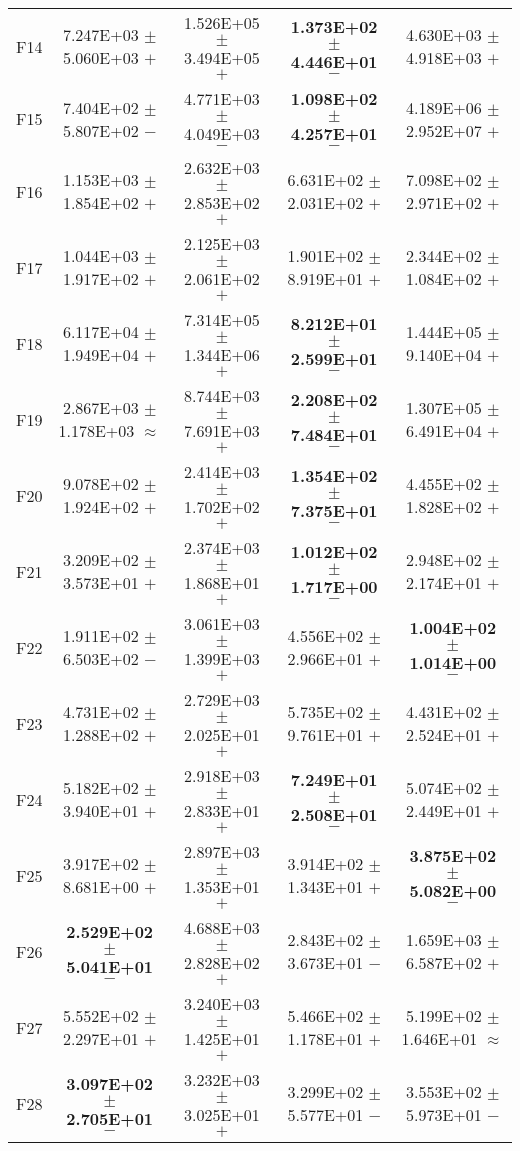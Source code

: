 \documentclass[paper]{ieice}
\begin{document}
\begin{table*}[htbp]
\begin{tabular}{c|c|c|c|c}
		F14	&	7.247E+03	$\pm$	5.060E+03	$+$	&	1.526E+05	$\pm$	3.494E+05	$+$	&	\textbf{1.373E+02	$\pm$	4.446E+01}	$-$	&	4.630E+03	$\pm$	4.918E+03	$+$	\\
		F15	&	7.404E+02	$\pm$	5.807E+02	$-$	&	4.771E+03	$\pm$	4.049E+03	$-$	&	\textbf{1.098E+02	$\pm$	4.257E+01}	$-$	&	4.189E+06	$\pm$	2.952E+07	$+$	\\
		F16	&	1.153E+03	$\pm$	1.854E+02	$+$	&	2.632E+03	$\pm$	2.853E+02	$+$	&	6.631E+02	$\pm$	2.031E+02	$+$	&	7.098E+02	$\pm$	2.971E+02	$+$	\\
		F17	&	1.044E+03	$\pm$	1.917E+02	$+$	&	2.125E+03	$\pm$	2.061E+02	$+$	&	1.901E+02	$\pm$	8.919E+01	$+$	&	2.344E+02	$\pm$	1.084E+02	$+$	\\
		F18	&	6.117E+04	$\pm$	1.949E+04	$+$	&	7.314E+05	$\pm$	1.344E+06	$+$	&	\textbf{8.212E+01	$\pm$	2.599E+01}	$-$	&	1.444E+05	$\pm$	9.140E+04	$+$	\\
		F19	&	2.867E+03	$\pm$	1.178E+03	$\approx$	&	8.744E+03	$\pm$	7.691E+03	$+$	&	\textbf{2.208E+02	$\pm$	7.484E+01}	$-$	&	1.307E+05	$\pm$	6.491E+04	$+$	\\
		F20	&	9.078E+02	$\pm$	1.924E+02	$+$	&	2.414E+03	$\pm$	1.702E+02	$+$	&	\textbf{1.354E+02	$\pm$	7.375E+01}	$-$	&	4.455E+02	$\pm$	1.828E+02	$+$	\\
		F21	&	3.209E+02	$\pm$	3.573E+01	$+$	&	2.374E+03	$\pm$	1.868E+01	$+$	&	\textbf{1.012E+02	$\pm$	1.717E+00}	$-$	&	2.948E+02	$\pm$	2.174E+01	$+$	\\
		F22	&	1.911E+02	$\pm$	6.503E+02	$-$	&	3.061E+03	$\pm$	1.399E+03	$+$	&	4.556E+02	$\pm$	2.966E+01	$+$	&	\textbf{1.004E+02	$\pm$	1.014E+00}	$-$	\\
		F23	&	4.731E+02	$\pm$	1.288E+02	$+$	&	2.729E+03	$\pm$	2.025E+01	$+$	&	5.735E+02	$\pm$	9.761E+01	$+$	&	4.431E+02	$\pm$	2.524E+01	$+$	\\
		F24	&	5.182E+02	$\pm$	3.940E+01	$+$	&	2.918E+03	$\pm$	2.833E+01	$+$	&	\textbf{7.249E+01	$\pm$	2.508E+01}	$-$	&	5.074E+02	$\pm$	2.449E+01	$+$	\\
		F25	&	3.917E+02	$\pm$	8.681E+00	$+$	&	2.897E+03	$\pm$	1.353E+01	$+$	&	3.914E+02	$\pm$	1.343E+01	$+$	&	\textbf{3.875E+02	$\pm$	5.082E+00}	$-$	\\
		F26	&	\textbf{2.529E+02	$\pm$	5.041E+01}	$-$	&	4.688E+03	$\pm$	2.828E+02	$+$	&	2.843E+02	$\pm$	3.673E+01	$-$	&	1.659E+03	$\pm$	6.587E+02	$+$	\\
		F27	&	5.552E+02	$\pm$	2.297E+01	$+$	&	3.240E+03	$\pm$	1.425E+01	$+$	&	5.466E+02	$\pm$	1.178E+01	$+$	&	5.199E+02	$\pm$	1.646E+01	$\approx$	\\
		F28	&	\textbf{3.097E+02	$\pm$	2.705E+01}	$-$	&	3.232E+03	$\pm$	3.025E+01	$+$	&	3.299E+02	$\pm$	5.577E+01	$-$	&	3.553E+02	$\pm$	5.973E+01	$-$	\\

\end{tabular}
\end{table*}
\end{document}
